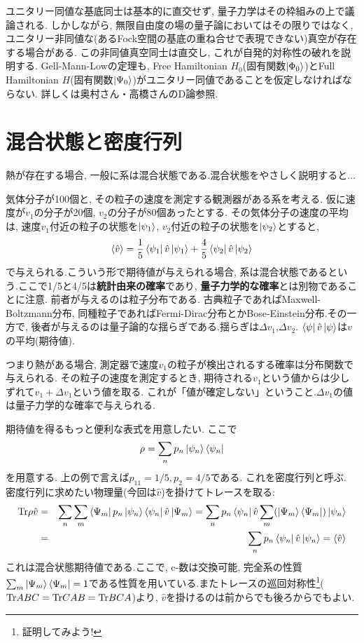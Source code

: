 \documentclass[10.5pt,a4paper]{jreport}
\begin{document}
ユニタリー同値な基底同士は基本的に直交せず, 量子力学はその枠組みの上で議論される. しかしながら, 無限自由度の場の量子論においてはその限りではなく, ユニタリー非同値な(あるFock空間の基底の重ね合せで表現できない)真空が存在する場合がある. この非同値真空同士は直交し, これが自発的対称性の破れを説明する. Gell-Mann-Lowの定理も, Free Hamiltonian $H_0$(固有関数$\ket{\Phi_0}$)とFull Hamiltonian $H$(固有関数$\ket{\Psi_0}$)がユニタリー同値であることを仮定しなければならない. 詳しくは奥村さん・高橋さんのD論参照. 
\section{混合状態と密度行列}
熱が存在する場合, 一般に系は混合状態である.混合状態をやさしく説明すると...
\begin{screen}
  気体分子が100個と, その粒子の速度を測定する観測器がある系を考える. 仮に速度が$v_1$の分子が20個, $v_2$の分子が80個あったとする. その気体分子の速度の平均は, 速度$v_1$付近の粒子の状態を$\ket{\psi_1}$, $v_2$付近の粒子の状態を$\ket{\psi_2}$とすると,
  \begin{eqnarray*}
    \expval{\hat{v}} = \frac{1}{5}\bra{\psi_1}\hat{v}\ket{\psi_1} + \frac{4}{5}\bra{\psi_2}\hat{v}\ket{\psi_2}
  \end{eqnarray*}
  で与えられる.こういう形で期待値が与えられる場合, 系は混合状態であるという.ここで1/5と4/5は{\bf 統計由来の確率}であり, {\bf 量子力学的な確率}とは別物であることに注意. 前者が与えるのは粒子分布である. 古典粒子であればMaxwell-Boltzmann分布, 同種粒子であればFermi-Dirac分布とかBose-Einstein分布.その一方で, 後者が与えるのは量子論的な揺らぎである.揺らぎは$\Delta v_1$,$\Delta v_2$. $\bra{\psi}\hat{v}\ket{\psi}$は$v$の平均(期待値).
\end{screen}

つまり熱がある場合, 測定器で速度$v_1$の粒子が検出されるする確率は分布関数で与えられる. その粒子の速度を測定するとき, 期待される$v_1$という値からは少しずれて$v_1 + \Delta v_1$という値を取る. これが「値が確定しない」ということ.$\Delta v_1$の値は量子力学的な確率で与えられる.

期待値を得るもっと便利な表式を用意したい. ここで
\begin{eqnarray}
  \rho = \sum_np_n\ket{\psi_n}\bra{\psi_n}
\end{eqnarray}
を用意する. 上の例で言えば$p_11 = 1/5, p_2 = 4/5$である. これを密度行列と呼ぶ. 密度行列に求めたい物理量(今回は$\hat{v}$)を掛けてトレースを取る:
\begin{eqnarray}
  \nonumber    {\rm Tr}\rho\hat{v} &=& \sum_n\sum_m\bra{\Psi_m}p_n\ket{\psi_n}\bra{\psi_n}\hat{v}\ket{\Psi_m} = \sum_np_n\bra{\psi_n}\hat{v}\sum_m(\ket{\Psi_m}\bra{\Psi_m})\ket{\psi_n}\\
  &=&\sum_np_n\bra{\psi_n}\hat{v}\ket{\psi_n} = \expval{\hat{v}}
\end{eqnarray}
これは混合状態期待値である.ここで, c-数は交換可能, 完全系の性質$\sum_m\ket{\Psi_m}\bra{\Psi_m} = 1$である性質を用いている.またトレースの巡回対称性\footnote{証明してみよう!}(${\rm Tr}ABC = {\rm Tr}CAB = {\rm Tr}BCA$)より, $\hat{v}$を掛けるのは前からでも後ろからでもよい.
\end{document}
